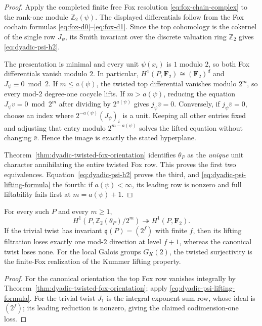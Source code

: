 \begin{proof}
Apply the completed finite free Fox resolution
\eqref{eq:fox-chain-complex} to the rank-one module
$\mathbb Z_2(\psi)$.  The displayed differentials
follow from the Fox cochain formulas
\eqref{eq:fox-d0}--\eqref{eq:fox-d1}.
Since the top cohomology is the cokernel of
the single row $J_\psi$, its Smith invariant
over the discrete valuation ring $\mathbb Z_2$
gives \eqref{eq:dyadic-psi-h2}.

The presentation is minimal and every unit
$\psi(x_i)$ is $1$ modulo $2$, so both Fox
differentials vanish modulo $2$.  In particular,
$H^1(P,\mathbf F_2)\cong(\mathbf F_2)^d$ and
$J_\psi\equiv0\bmod2$.
If $m\le a(\psi)$, the twisted top differential
vanishes modulo $2^m$, so every mod-$2$ degree-one
cocycle lifts.  If $m>a(\psi)$, reducing the
equation $J_\psi v=0\bmod2^m$ after dividing by
$2^{a(\psi)}$ gives $j_\psi\bar v=0$.
Conversely, if $j_\psi\bar v=0$, choose an index
where $2^{-a(\psi)}(J_\psi)_i$ is a unit.  Keeping
all other entries fixed and adjusting that entry
modulo $2^{m-a(\psi)}$ solves the lifted equation
without changing $\bar v$.  Hence the image is
exactly the stated hyperplane.

Theorem~\ref{thm:dyadic-twisted-fox-orientation}
identifies $\theta_P$ as the \emph{unique} unit
character annihilating the entire twisted Fox row.
This proves the first two equivalences.
Equation~\eqref{eq:dyadic-psi-h2} proves the third,
and \eqref{eq:dyadic-psi-lifting-formula} the fourth:
if $a(\psi)<\infty$, its leading row is nonzero
and full liftability fails first at $m=a(\psi)+1$.
\end{proof}

\begin{corollary}
\label{cor:dyadic-orientation-kummer-lifts}
For every such $P$ and every $m\ge1$,
\[
H^1(P,\mathbb Z_2(\theta_P)/2^m)
\twoheadrightarrow H^1(P,\mathbf F_2).
\]
If the trivial twist has invariant
$\mathfrak q(P)=(2^f)$ with finite $f$,
then its lifting filtration loses exactly
one mod-$2$ direction at level $f+1$,
whereas the canonical twist loses none.
For the local Galois groups $G_K(2)$,
the twisted surjectivity is the finite-Fox
realization of the Kummer lifting property.
\end{corollary}

\begin{proof}
For the canonical orientation the top Fox row
vanishes integrally by
Theorem~\ref{thm:dyadic-twisted-fox-orientation};
apply \eqref{eq:dyadic-psi-lifting-formula}.
For the trivial twist $J_1$ is the integral
exponent-sum row, whose ideal is $(2^f)$;
its leading reduction is nonzero, giving
the claimed codimension-one loss.
\end{proof}

